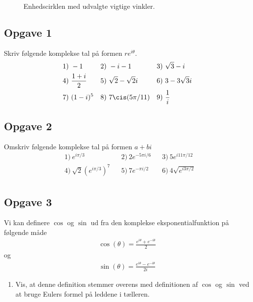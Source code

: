 \begin{figure}[H]
	\caption{Enhedscirklen med udvalgte vigtige vinkler.}
	\label{fig:enhed}
\end{figure}

\subsection*{Opgave 1}
Skriv følgende komplekse tal på formen $re^{i\theta}$. 
\begin{align*}
	&1) \ -1   &&2) \ -i - 1   &&3) \  \sqrt{3} - i   \\
	&4) \ \frac{1 + i}{2}   &&5) \ \sqrt{2} - \sqrt{2}i   &&6) \  3 - 3\sqrt{3}i     \\
	&7) \ (1-i)^5   &&8) \ 7\cis(5\pi/11)   &&9) \ \frac{1}{i}     \\
\end{align*}

\subsection*{Opgave 2}
Omskriv følgende komplekse tal på formen $a + bi$
\begin{align*}
	&1) \ e^{i\pi/3}  &&2) \ 2e^{-5\pi i/6}   &&3) \  5e^{i 11\pi/12}   \\
	&4) \ \sqrt{2}(e^{i \pi/3})^7   &&5) \ 7e^{-\pi i / 2 }   &&6) \   4\sqrt{e^{i 3\pi/2}}    \\
\end{align*}

\subsection*{Opgave 3}
Vi kan definere $\cos$ og $\sin$ ud fra den komplekse eksponentialfunktion på følgende måde
\begin{align*}
	\cos(\theta) = \frac{e^{i\theta}+e^{-i\theta}}{2}
\end{align*}
og
\begin{align*}
	\sin(\theta) = \frac{e^{i\theta}-e^{-i\theta}}{2i}
\end{align*}
\begin{enumerate}[label=\roman*)]
	\item Vis, at denne definition stemmer overens med definitionen af $\cos$ og $\sin$ ved at bruge Eulers formel på 
	leddene i tælleren. 
\end{enumerate}
